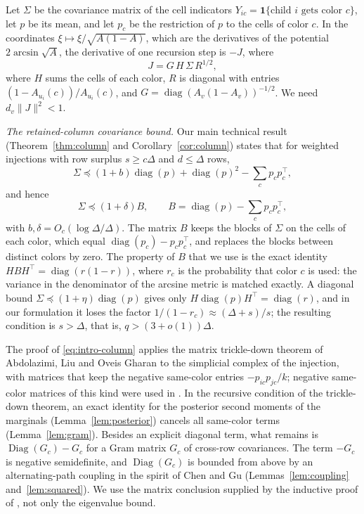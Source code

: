 \documentclass{amsart}
\numberwithin{equation}{section}
\theoremstyle{plain}
\theoremstyle{definition}
\theoremstyle{remark}
\newcommand{\diag}{\operatorname{diag}}
\newcommand{\Diag}{\operatorname{Diag}}
\newcommand{\T}{\top}
\newcommand{\one}{\mathbf{1}}
\begin{document}
Let $\Sigma$ be the covariance matrix of the cell indicators $Y_{ic}=\one\{\text{child }i\text{ gets color }c\}$, let $p$ be its mean, and let $p_c$ be the restriction of $p$ to the cells of color $c$. In the coordinates $\xi\mapsto\xi/\sqrt{A(1-A)}$, which are the derivatives of the potential $2\arcsin\sqrt{A}$, the derivative of one recursion step is $-J$, where
\[
J=G\,H\,\Sigma\,R^{1/2},
\]
where $H$ sums the cells of each color, $R$ is diagonal with entries $(1-A_{u_i}(c))/A_{u_i}(c)$, and $G=\diag(A_v(1-A_v))^{-1/2}$. We need $d_v\|J\|^2<1$.

\emph{The retained-column covariance bound.} Our main technical result (Theorem~\ref{thm:column} and Corollary~\ref{cor:column}) states that for weighted injections with row surplus $s\ge c\Delta$ and $d\le\Delta$ rows,
\begin{equation}\label{eq:intro-column}
\Sigma\preceq(1+b)\diag(p)+\diag(p)^2-\sum_c p_cp_c^\T,
\end{equation}
and hence
\[
\Sigma\preceq(1+\delta)B,\qquad B=\diag(p)-\sum_cp_cp_c^\T,
\]
with $b,\delta=O_c(\log\Delta/\Delta)$. The matrix $B$ keeps the blocks of $\Sigma$ on the cells of each color, which equal $\diag(p_c)-p_cp_c^\T$, and replaces the blocks between distinct colors by zero. The property of $B$ that we use is the exact identity $HBH^\T=\diag(r(1-r))$, where $r_c$ is the probability that color $c$ is used: the variance in the denominator of the arcsine metric is matched exactly. A diagonal bound $\Sigma\preceq(1+\eta)\diag(p)$ gives only $H\diag(p)H^\T=\diag(r)$, and in our formulation it loses the factor $1/(1-r_c)\approx(\Delta+s)/s$; the resulting condition is $s>\Delta$, that is, $q>(3+o(1))\Delta$.

The proof of \eqref{eq:intro-column} applies the matrix trickle-down theorem of Abdolazimi, Liu and Oveis Gharan \cite{ALG} to the simplicial complex of the injection, with matrices that keep the negative same-color entries $-p_{ic}p_{jc}/k$; negative same-color matrices of this kind were used in \cite{WZZ,CWZZ}. In the recursive condition of the trickle-down theorem, an exact identity for the posterior second moments of the marginals (Lemma~\ref{lem:posterior}) cancels all same-color terms (Lemma~\ref{lem:gram}). Besides an explicit diagonal term, what remains is $\Diag(G_c)-G_c$ for a Gram matrix $G_c$ of cross-row covariances. The term $-G_c$ is negative semidefinite, and $\Diag(G_c)$ is bounded from above by an alternating-path coupling in the spirit of Chen and Gu \cite[Algorithm~1]{CG} (Lemmas~\ref{lem:coupling} and~\ref{lem:squared}). We use the matrix conclusion supplied by the inductive proof of \cite[Theorem~3.2]{ALG}, not only the eigenvalue bound.
\end{document}
